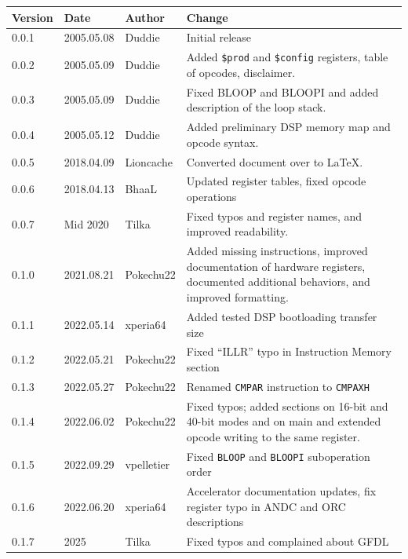 \documentclass[oneside,english,a4paper,10pt,oneside,openany,final]{memoir}
\newcommand{\Register}[1]{\texttt{#1}}
\begin{document}
\begin{table}[htb]
\centering
\begin{tabular}{|p{.5in}|p{.75in}|p{.75in}|p{3.5in}|}
\hline
\textbf{Version} & \textbf{Date} & \textbf{Author} & \textbf{Change}                                                                          \\ \hline
0.0.1            & 2005.05.08    & Duddie          & Initial release                                                                          \\ \hline
0.0.2            & 2005.05.09    & Duddie          & Added \Register{\$prod} and \Register{\$config} registers, table of opcodes, disclaimer. \\ \hline
0.0.3            & 2005.05.09    & Duddie          & Fixed BLOOP and BLOOPI and added description of the loop stack.                          \\ \hline
0.0.4            & 2005.05.12    & Duddie          & Added preliminary DSP memory map and opcode syntax.                                      \\ \hline
0.0.5            & 2018.04.09    & Lioncache       & Converted document over to LaTeX.                                                        \\ \hline
0.0.6            & 2018.04.13    & BhaaL           & Updated register tables, fixed opcode operations                                         \\ \hline
0.0.7            & Mid 2020      & Tilka           & Fixed typos and register names, and improved readability.                                \\ \hline
0.1.0            & 2021.08.21    & Pokechu22       & Added missing instructions, improved documentation of hardware registers, documented additional behaviors, and improved formatting. \\ \hline
0.1.1            & 2022.05.14    & xperia64        & Added tested DSP bootloading transfer size                                               \\ \hline
0.1.2            & 2022.05.21    & Pokechu22       & Fixed ``ILLR'' typo in Instruction Memory section                                        \\ \hline
0.1.3            & 2022.05.27    & Pokechu22       & Renamed \texttt{CMPAR} instruction to \texttt{CMPAXH}                                    \\ \hline
0.1.4            & 2022.06.02    & Pokechu22       & Fixed typos; added sections on 16-bit and 40-bit modes and on main and extended opcode writing to the same register. \\ \hline
0.1.5            & 2022.09.29    & vpelletier      & Fixed \texttt{BLOOP} and \texttt{BLOOPI} suboperation order \\ \hline
0.1.6            & 2022.06.20    & xperia64        & Accelerator documentation updates, fix register typo in ANDC and ORC descriptions         \\ \hline
0.1.7            & 2025          & Tilka           & Fixed typos and complained about GFDL \\ \hline
\end{tabular}
\end{table}
\end{document}
